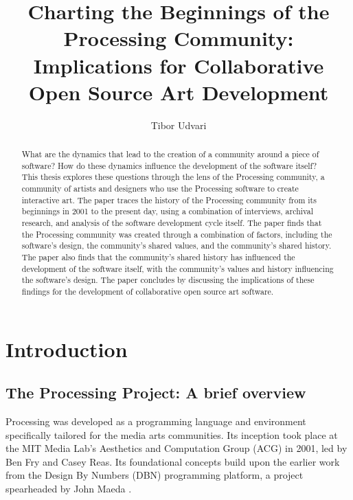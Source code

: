 \documentclass{article}
\title{Charting the Beginnings of the Processing Community: Implications for Collaborative Open Source Art Development}
\author{Tibor Udvari}
\begin{document}
\maketitle

\begin{abstract}
What are the dynamics that lead to the creation of a community around a piece of software? How do these dynamics influence the development of the software itself? This thesis explores these questions through the lens of the Processing community, a community of artists and designers who use the Processing software to create interactive art. The paper traces the history of the Processing community from its beginnings in 2001 to the present day, using a combination of interviews, archival research, and analysis of the software development cycle itself. The paper finds that the Processing community was created through a combination of factors, including the software's design, the community's shared values, and the community's shared history. The paper also finds that the community's shared history has influenced the development of the software itself, with the community's values and history influencing the software's design. The paper concludes by discussing the implications of these findings for the development of collaborative open source art software.
\end{abstract}


\section{Introduction}

\subsection{The Processing Project: A brief overview}

Processing was developed as a programming language and environment specifically tailored for the media arts communities. Its inception took place at the MIT Media Lab's Aesthetics and Computation Group (ACG) in 2001, led by Ben Fry and Casey Reas. Its foundational concepts build upon the earlier work from the Design By Numbers (DBN) programming platform, a project spearheaded by John Maeda \parencite{fryModernPrometheusHistory2018}.
\end{document}
